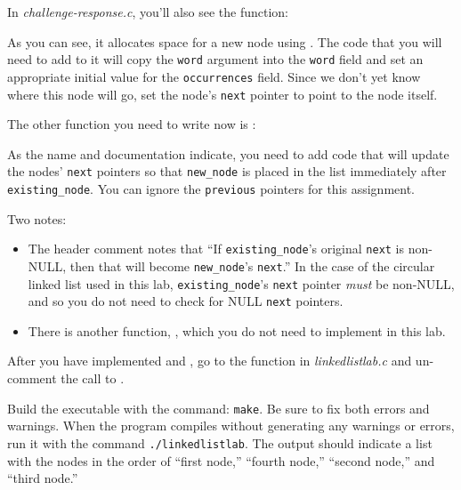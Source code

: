 In \textit{challenge-response.c}, you'll also see the  function:



As you can see, it allocates space for a new node using .
The code that you will need to add to it will copy the \lstinline{word} argument into the \lstinline{word} field and set an appropriate initial value for the \lstinline{occurrences} field.
Since we don't yet know where this node will go, set the node's \lstinline{next} pointer to point to the node itself.

The other function you need to write now is :



As the name and documentation indicate, you need to add code that will update the nodes' \lstinline{next} pointers so that \lstinline{new_node} is placed in the list immediately after \lstinline{existing_node}.
You can ignore the \lstinline{previous} pointers for this assignment.

Two notes:
\begin{itemize}
    \item The header comment notes that ``If \lstinline{existing_node}'s original \lstinline{next} is non-NULL, then that will become \lstinline{new_node}'s \lstinline{next}.''
            In the case of the circular linked list used in this lab, \lstinline{existing_node}'s \lstinline{next} pointer \textit{must} be non-NULL, and so you do not need to check for NULL \lstinline{next} pointers.
    \item There is another function, , which you do not need to implement in this lab.
\end{itemize}

After you have implemented  and , go to the  function in \textit{linkedlistlab.c} and un-comment the call to .



Build the executable with the command: \texttt{make}.
Be sure to fix both errors and warnings.
When the program compiles without generating any warnings or errors, run it with the command \texttt{./linkedlistlab}.
The output should indicate a list with the nodes in the order of ``first node,'' ``fourth node,'' ``second node,'' and ``third node.''

